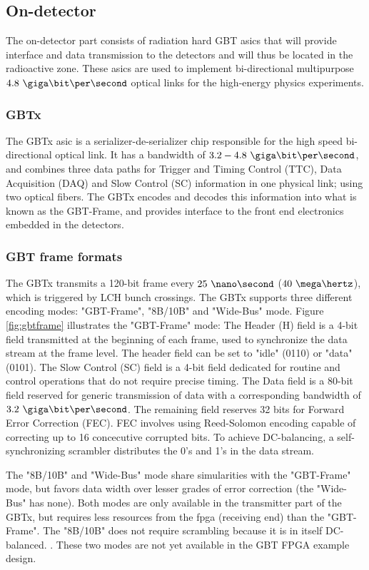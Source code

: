 \documentclass[main.tex]{subfiles}
\begin{document}
\subsection{On-detector}
The on-detector part consists of radiation hard GBT \acrshort{asic}s that will provide interface and data transmission to the detectors and will thus be located in the radioactive zone. These \glspl{asic} are used to implement bi-directional multipurpose $4.8~\giga\bit\per\second$ optical links for the high-energy physics experiments.

\subsubsection{GBTx}
The GBTx \gls{asic} is a serializer-de-serializer chip responsible for the high speed bi-directional optical link. It has a bandwidth of $3.2 - 4.8~\giga\bit\per\second$, and combines three data paths for Trigger and Timing Control (TTC), Data Acquisition (DAQ) and Slow Control (SC) information in one physical link; using two optical fibers. The GBTx encodes and decodes this information into what is known as the GBT-Frame, and provides interface to the front end electronics embedded in the detectors. \cite{gbtxman11}

\subsubsection{GBT frame formats}
 The GBTx transmits a 120-bit frame every $25~\nano\second$ ($40~\mega\hertz$), which is triggered by LCH bunch crossings. The GBTx supports three different encoding modes: "GBT-Frame", "8B/10B" and "Wide-Bus" mode. Figure \ref{fig:gbtframe} illustrates the "GBT-Frame" mode: The Header (H) field is a 4-bit field transmitted at the beginning of each frame, used to synchronize the data stream at the frame level. The header field can be set to "idle" (0110) or "data" (0101). The Slow Control (SC) field is a 4-bit field dedicated for routine and control operations that do not require precise timing. The Data field is a 80-bit field reserved for generic transmission of data with a corresponding bandwidth of $3.2~\giga\bit\per\second$. The remaining field reserves 32 bits for Forward Error Correction (FEC). FEC involves using Reed-Solomon encoding capable of correcting up to 16 concecutive corrupted bits. To achieve DC-balancing, a self-synchronizing scrambler distributes the 0's and 1's in the data stream.

The "8B/10B" and "Wide-Bus" mode share simularities with the "GBT-Frame" mode, but favors data width over lesser grades of error correction (the "Wide-Bus" has none). Both modes are only available in the transmitter part of the GBTx, but requires less resources from the \gls{fpga} (receiving end) than the "GBT-Frame". The "8B/10B" does not require scrambling because it is in itself DC-balanced. \cite{gbtxman11}. These two modes are not yet available in the GBT FPGA example design.
\end{document}
